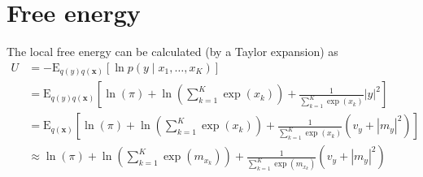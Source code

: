 \section{Free energy}

The local free energy can be calculated (by a Taylor expansion) as 
\begin{equation}
    \begin{split}
        U
        &= -\mathrm{E}_{q(y)q(\bm{x})} \left[\ln p(y\mid x_1,\ldots, x_K)\right] \\
        &= \mathrm{E}_{q(y)q(\bm{x})} \left[\ln(\pi) +\ln\left(\sum_{k=1}^K \exp(x_k)\right) +\frac{1}{\sum_{k=1}^K \exp(x_k)}|y|^2\right] \\
        &= \mathrm{E}_{q(\bm{x})} \left[\ln(\pi) +\ln\left(\sum_{k=1}^K \exp(x_k)\right) +\frac{1}{\sum_{k=1}^K \exp(x_k)}(v_y + |m_y|^2)\right] \\
        &\approx \ln(\pi) +\ln\left(\sum_{k=1}^K \exp(m_{x_k})\right) +\frac{1}{\sum_{k=1}^K \exp(m_{x_k})}(v_y + |m_y|^2)
    \end{split}
\end{equation}